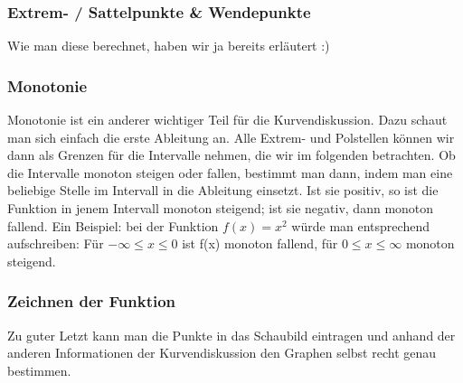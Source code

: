 \subsubsection{Extrem- / Sattelpunkte \& Wendepunkte}
Wie man diese berechnet, haben wir ja bereits erläutert :)
\subsubsection{Monotonie}
Monotonie ist ein anderer wichtiger Teil für die Kurvendiskussion. Dazu schaut man sich einfach die erste Ableitung an. Alle Extrem- und Polstellen können wir dann als Grenzen für die Intervalle nehmen, die wir im folgenden betrachten. Ob die Intervalle monoton steigen oder fallen, bestimmt man dann, indem man eine beliebige Stelle im Intervall in die Ableitung einsetzt. Ist sie positiv, so ist die Funktion in jenem Intervall monoton steigend; ist sie negativ, dann monoton fallend. Ein Beispiel: bei der Funktion \(f(x)=x^2\) würde man entsprechend aufschreiben: Für \(-\infty \le x \le 0\) ist f(x) monoton fallend, für \(0\le x\le \infty\) monoton steigend.
\subsubsection{Zeichnen der Funktion}
Zu guter Letzt kann man die Punkte in das Schaubild eintragen und anhand der anderen Informationen der Kurvendiskussion den Graphen selbst recht genau bestimmen.


